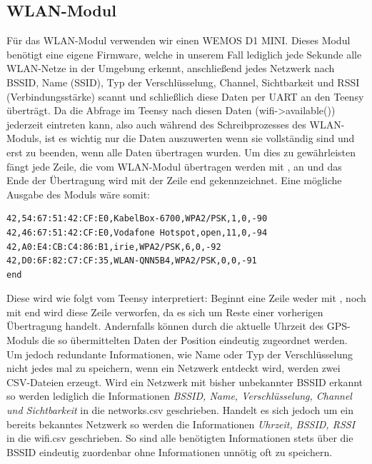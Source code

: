 \documentclass[a4paper,11pt, ngerman]{scrartcl}
\begin{document}
\subsection{WLAN-Modul}
Für das WLAN-Modul verwenden wir einen \grqq WEMOS D1 MINI\grqq . Dieses Modul benötigt eine eigene Firmware, welche in unserem Fall lediglich jede Sekunde alle WLAN-Netze in der Umgebung erkennt, anschließend jedes Netzwerk nach BSSID, Name (SSID), Typ der Verschlüsselung, Channel, Sichtbarkeit und RSSI (Verbindungsstärke) scannt und schließlich diese Daten per UART an den Teensy überträgt. Da die Abfrage im Teensy nach diesen Daten (wifi->available()) jederzeit eintreten kann, also auch während des Schreibprozesses des WLAN-Moduls, ist es wichtig nur die Daten auszuwerten wenn sie vollständig sind und erst zu beenden, wenn alle Daten übertragen wurden. Um dies zu gewährleisten fängt jede Zeile, die vom WLAN-Modul übertragen werden mit ,\grqq{} an und das Ende der Übertragung wird mit der Zeile \grqq end\grqq{} gekennzeichnet. Eine mögliche Ausgabe des Moduls wäre somit:
\begin{lstlisting}
42,54:67:51:42:CF:E0,KabelBox-6700,WPA2/PSK,1,0,-90
42,46:67:51:42:CF:E0,Vodafone Hotspot,open,11,0,-94
42,A0:E4:CB:C4:86:B1,irie,WPA2/PSK,6,0,-92
42,D0:6F:82:C7:CF:35,WLAN-QNN5B4,WPA2/PSK,0,0,-91
end
\end{lstlisting}
Diese wird wie folgt vom Teensy interpretiert: Beginnt eine Zeile weder mit ,\grqq{} noch mit \grqq end\grqq{} wird diese Zeile verworfen, da es sich um Reste einer vorherigen Übertragung handelt. Andernfalls können durch die aktuelle Uhrzeit des GPS-Moduls die so übermittelten Daten der Position eindeutig zugeordnet werden. Um jedoch redundante Informationen, wie Name oder Typ der Verschlüsselung nicht jedes mal zu speichern, wenn ein Netzwerk entdeckt wird, werden zwei CSV-Dateien erzeugt. Wird ein Netzwerk mit bisher unbekannter BSSID erkannt so werden lediglich die Informationen \textit{BSSID, Name, Verschlüsselung, Channel und Sichtbarkeit} in die \grqq networks.csv\grqq{} geschrieben. Handelt es sich jedoch um ein bereits bekanntes Netzwerk so werden die Informationen \textit{Uhrzeit, BSSID, RSSI} in die \grqq wifi.csv \grqq{} geschrieben. So sind alle benötigten Informationen stets über die BSSID eindeutig zuordenbar ohne Informationen unnötig oft zu speichern.
\end{document}
